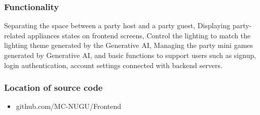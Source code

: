 \documentclass[conference]{IEEEtran}
\begin{document}
        \subsubsection{Functionality}
            Separating the space between a party host and a party guest, Displaying party-related appliances states on frontend screens, Control the lighting to match the lighting theme generated by the Generative AI, Managing the party mini games generated by Generative AI, and basic functions to support users such as signup, login authentication, account settings connected with backend servers.\\
        \subsubsection{Location of source code}
            \begin{itemize}
                \item  github.com/MC-NUGU/Frontend
            \end{itemize}
\end{document}
